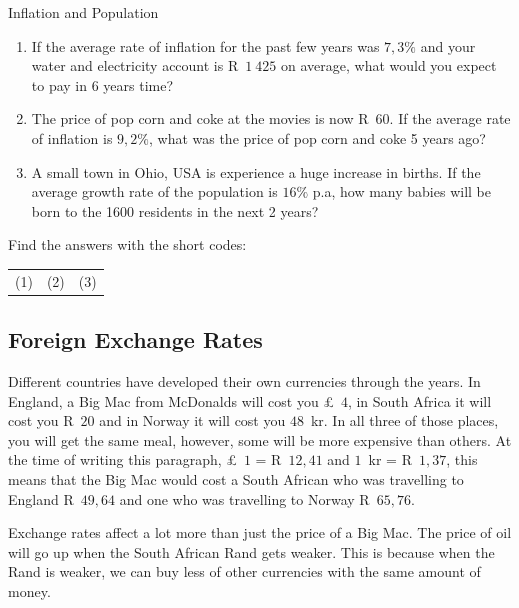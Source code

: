 \begin{exercises}{Inflation and Population}
    \begin{enumerate}[label=\textbf{\arabic*}.]
	\item If the average rate of inflation for the past few years was $7,3\%$ and your water and electricity account is R~$1~425$ on average, what would you expect to pay in 6 years time?

	\item The price of pop corn and coke at the movies is now R~$60$. If the average rate of inflation is $9,2\%$, what was the price of pop corn and coke 5 years ago?

	\item A small town in Ohio, USA is experience a huge increase in births. If the average growth rate of the population is $16\%$ p.a, how many babies will be born to the 1600 residents in the next 2 years?\\
    \end{enumerate}

    Find the answers with the short codes:\\
    \begin{tabularx}{\textwidth}{ XXX }
	(1)	&	(2)	&	(3)\\
    \end{tabularx}
\end{exercises}



\subsection{Foreign Exchange Rates}

Different countries have developed their own currencies through the years. In England, a Big Mac from McDonalds will cost you £~$4$, in South Africa it will cost you R~$20$ and in Norway it will cost you $48$~kr. In all three of those places, you will get the same meal, however, some will be more expensive than others. At the time of writing this paragraph, £~$1$ = R~$12,41$ and $1$~kr = R~$1,37$, this means that the Big Mac would cost a South African who was travelling to England R~$49,64$ and one who was travelling to Norway R~$65,76$.\par

Exchange rates affect a lot more than just the price of a Big Mac. The price of oil will go up when the South African Rand gets weaker. This is because when the Rand is weaker, we can buy less of other currencies with the same amount of money.\par

